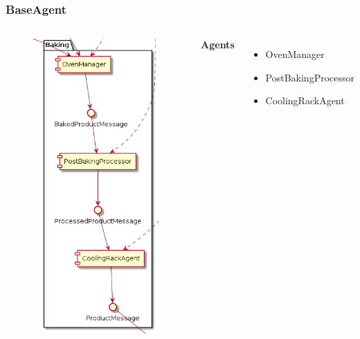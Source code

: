 \documentclass{beamer}
\begin{document}
\begin{frame}
    \frametitle{\huge{BaseAgent}}
    \begin{columns}[t]
        \begin{figure}[H]
            \centering
            \includegraphics[width=0.6\linewidth]{baking_component_diagram.png}
        \end{figure}
            \textbf{Agents}
            \begin{itemize}
                \item OvenManager
                \item PostBakingProcessor
                \item CoolingRackAgent
            \end{itemize}
    \end{columns}
\end{frame}
\end{document}
